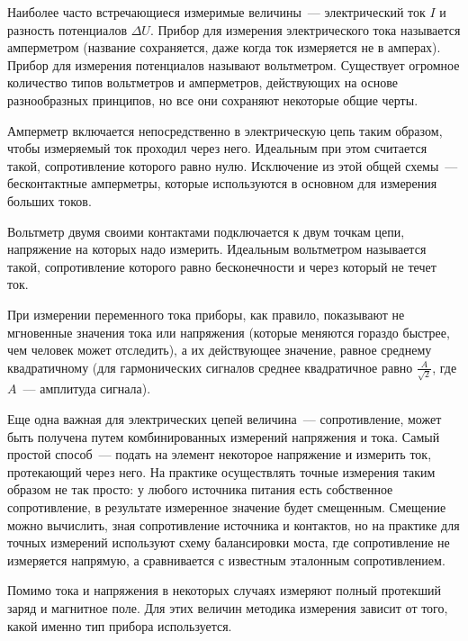 
Наиболее часто встречающиеся измеримые величины~--- электрический ток $I$ и разность потенциалов $\Delta U$. Прибор для измерения электрического тока называется амперметром (название сохраняется, даже когда ток измеряется не в амперах). Прибор для измерения потенциалов называют вольтметром. Существует огромное количество типов вольтметров и амперметров, действующих на основе разнообразных принципов, но все они сохраняют некоторые общие черты.

Амперметр включается непосредственно в электрическую цепь таким образом, чтобы измеряемый ток проходил через него. Идеальным при этом считается такой, сопротивление которого равно нулю. Исключение из этой общей схемы~--- бесконтактные амперметры, которые используются в основном для измерения больших токов. 

Вольтметр двумя своими контактами подключается к двум точкам цепи, напряжение на которых надо измерить. Идеальным вольтметром называется такой, сопротивление которого равно бесконечности и через который не течет ток.

При измерении переменного тока приборы, как правило, показывают не мгновенные значения тока или напряжения (которые меняются гораздо быстрее, чем человек может отследить), а их действующее значение, равное среднему квадратичному (для гармонических сигналов среднее квадратичное равно $\frac{A}{\sqrt{2}}$, где $A$~--- амплитуда сигнала).

Еще одна важная для электрических цепей величина~--- сопротивление, может быть получена путем комбинированных измерений напряжения и тока. Самый простой способ~--- подать на элемент некоторое напряжение и измерить ток, протекающий через него. На практике осуществлять точные измерения таким образом не так просто: у любого источника питания есть собственное сопротивление, в результате измеренное значение будет смещенным. Смещение можно вычислить, зная сопротивление источника и контактов, но на практике для точных измерений используют схему балансировки моста, где сопротивление не измеряется напрямую, а сравнивается с известным эталонным сопротивлением.

Помимо тока и напряжения в некоторых случаях измеряют полный протекший заряд и магнитное поле. Для этих величин методика измерения зависит от того, какой именно тип прибора используется.

